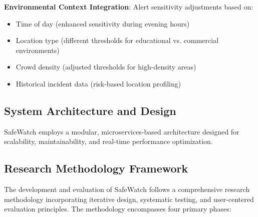 \documentclass[12pt,a4paper]{article}
\begin{document}
\textbf{Environmental Context Integration}: Alert sensitivity adjustments based on:
\begin{itemize}
    \item Time of day (enhanced sensitivity during evening hours)
    \item Location type (different thresholds for educational vs. commercial environments)
    \item Crowd density (adjusted thresholds for high-density areas)
    \item Historical incident data (risk-based location profiling)
\end{itemize}

\subsection{System Architecture and Design}

SafeWatch employs a modular, microservices-based architecture designed for scalability, maintainability, and real-time performance optimization.

\subsection{Research Methodology Framework}

The development and evaluation of SafeWatch follows a comprehensive research methodology incorporating iterative design, systematic testing, and user-centered evaluation principles. The methodology encompasses four primary phases:
\end{document}
